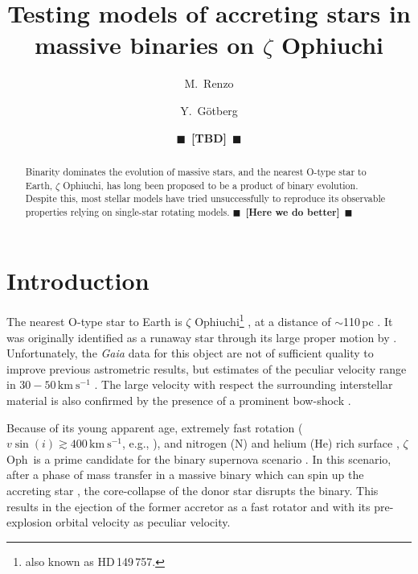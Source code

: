 \documentclass[twocolumn,twocolappendix,trackchanges]{aastex63}
\newcommand{\kms}{{\mathrm{km\ s^{-1}}}}
\newcommand{\zoph}{$\zeta$ Oph}
\newcommand{\todo}[1]{{\large $\blacksquare$~\textbf{\color{red}[#1]}}~$\blacksquare$}
\begin{document}
\graphicspath{{./figures/}}


\title{Testing models of accreting stars in
  massive binaries on $\zeta$ Ophiuchi}
\author[0000-0002-6718-9472]{M.~Renzo}

\author{Y.~G\"otberg}

\author{\todo{TBD}}

\begin{abstract}
  Binarity dominates the evolution of massive stars, and the nearest
  O-type star to Earth, $\zeta$ Ophiuchi, has long been proposed to be
  a product of binary evolution. Despite this, most stellar models
  have tried unsuccessfully to reproduce its observable properties
  relying on single-star rotating models.  \todo{Here we do better}
\end{abstract}

\vspace*{-10pt}


\section{Introduction}
\label{sec:intro}


The nearest O-type star to Earth is $\zeta$ Ophiuchi\footnote{also known
as HD\,149\,757.} \citep[spectral
type O9.5{\rm IVnn},][]{sota:14}, at %
a distance of $\sim$110\,pc \citep[e.g.,][and references
therein]{neuhauser:20}. It was originally identified as a runaway star
through its large proper motion by \cite{blaauw:52}.  Unfortunately,
the \emph{Gaia} data for this object are not of sufficient quality to
improve previous astrometric results, but estimates of the peculiar
velocity range in $30-50\,\kms$
\citep[e.g.,][]{zehe:18, neuhauser:20}. The
large velocity with respect the surrounding interstellar material is
also confirmed by the presence of a prominent bow-shock
\citep[e.g.,][]{bodensteiner:18}.

Because of its young apparent age, extremely fast rotation
($v\sin(i)\gtrsim 400\,\kms$, e.g., \citealt{zehe:18}), and nitrogen
(N) and helium (He) rich surface \citep[e.g.,][]{herrero:92,
  blaauw:93, villamariz:05, marcolino:09}, \zoph\ is a prime candidate
for the binary supernova scenario \citep{blaauw:61, renzo:19walk}. In
this scenario, after a phase of mass transfer in a massive binary
which can spin up the accreting star \citep[e.g.,][]{packet:81}, the
core-collapse of the donor star disrupts the binary. This results in
the ejection of the former accretor as a fast rotator and with its
pre-explosion orbital velocity as peculiar velocity.
\end{document}
